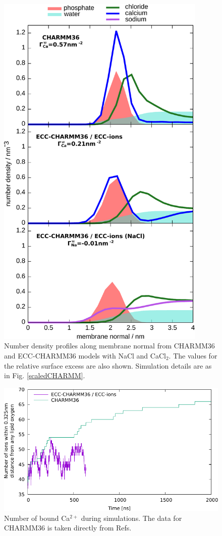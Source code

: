 \documentclass[journal=jpcbfk]{achemso}
\begin{document}
\newpage
\begin{figure}[!h]
  \centering
  \includegraphics[width=10.0cm]{../Fig/density2.pdf}
  \caption{\label{scaledCHARMMdensity}
    Number density profiles along membrane normal from CHARMM36 \cite{klauda10} and ECC-CHARMM36 models with NaCl and CaCl$_2$.
    The values for the relative surface excess are also shown. Simulation details are as in Fig. \ref{scaledCHARMM}.
  }
\end{figure}

\newpage
\begin{figure}[!h]
  \centering
  \includegraphics[width=16.0cm]{../Fig/contacts_ca.pdf}
  \caption{\label{scaledCHARMMcontacts}
    Number of bound Ca$^{2+}$ during simulations. The data for CHARMM36 is taken directly from Refs.  
  }
\end{figure}
\end{document}
